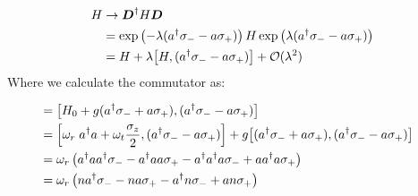 \begin{align*}
    H &\rightarrow \boldsymbol{D}^\dagger H \boldsymbol{D} \\
      &= \exp\left(-\lambda (a^\dagger \sigma_- - a \sigma_+) \right) H \exp\left(\lambda (a^\dagger \sigma_- - a \sigma_+) \right) \\
      &= H + \lambda\comm{H}{(a^\dagger \sigma_- - a \sigma_+)} + \mathcal{O}(\lambda^2)
\end{align*}
Where we calculate the commutator as:
\begin{fullwidth}
\begin{align*}
    &= \comm{H_0 + g(a^\dagger \sigma_- + a \sigma_+)}{(a^\dagger \sigma_- - a \sigma_+)} & \\
    &= \comm{\omega_r \; a^\dagger a + \omega_t\frac{\sigma_z}{2} }{(a^\dagger \sigma_- - a \sigma_+)} + g \comm{(a^\dagger \sigma_- + a \sigma_+)}{(a^\dagger \sigma_- - a \sigma_+)} \\
    &= \omega_r \left(a^\dagger a a^\dagger \sigma_- - a^\dagger a a \sigma_+ - a^\dagger a^\dagger a \sigma_- + a a^\dagger a \sigma_+ \right) \\
    &= \omega_r \left(n a^\dagger \sigma_- - n a \sigma_+ - a^\dagger n \sigma_- + a n \sigma_+ \right)
\end{align*}
\end{fullwidth}

